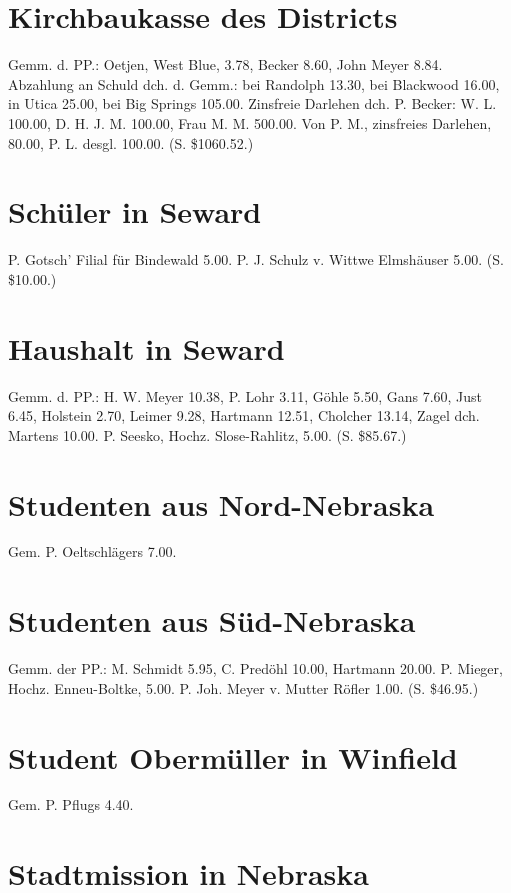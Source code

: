 \section{Kirchbaukasse des Districts}

Gemm. d. PP.: Oetjen, West Blue, 3.78, Becker 8.60, John Meyer 8.84. Abzahlung an Schuld dch. d. Gemm.: bei Randolph 13.30, bei Blackwood 16.00, in Utica 25.00, bei Big Springs 105.00. Zinsfreie Darlehen dch. P. Becker: W. L. 100.00, D. H. J. M. 100.00, Frau M. M. 500.00. Von P. M., zinsfreies Darlehen, 80.00, P. L. desgl. 100.00. (S. \$1060.52.)

\section{Schüler in Seward}

P. Gotsch' Filial für Bindewald 5.00. P. J. Schulz v. Wittwe Elmshäuser 5.00. (S. \$10.00.)

\section{Haushalt in Seward}

Gemm. d. PP.: H. W. Meyer 10.38, P. Lohr 3.11, Göhle 5.50, Gans 7.60, Just 6.45, Holstein 2.70, Leimer 9.28, Hartmann 12.51, Cholcher 13.14, Zagel dch. Martens 10.00. P. Seesko, Hochz. Slose-Rahlitz, 5.00. (S. \$85.67.)

\section{Studenten aus Nord-Nebraska}

Gem. P. Oeltschlägers 7.00.

\section{Studenten aus Süd-Nebraska}

Gemm. der PP.: M. Schmidt 5.95, C. Predöhl 10.00, Hartmann 20.00. P. Mieger, Hochz. Enneu-Boltke, 5.00. P. Joh. Meyer v. Mutter Röfler 1.00. (S. \$46.95.)

\section{Student Obermüller in Winfield}

Gem. P. Pflugs 4.40.

\section{Stadtmission in Nebraska}

